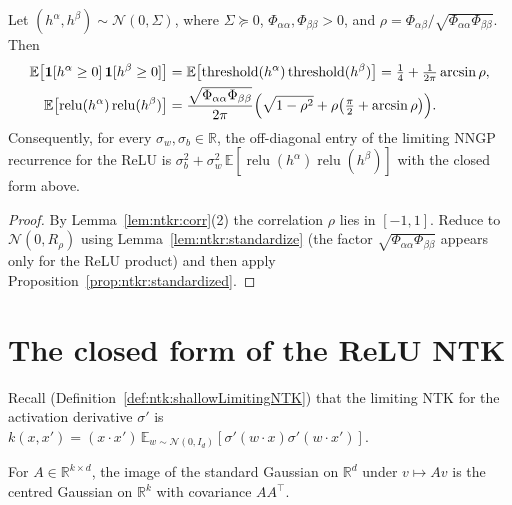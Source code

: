 \begin{theorem}\label{thm:ntkr:choSaul}
  \leanok
Let $(h^\alpha,h^\beta)\sim\mathcal N(0,\Sigma)$, where $\Sigma\succeq0$, $\Phi_{\alpha\alpha},\Phi_{\beta\beta}>0$, and
$\rho=\Phi_{\alpha\beta}/\sqrt{\Phi_{\alpha\alpha}\Phi_{\beta\beta}}$. Then
\begin{align*}
  \mathbb E\bigl[\mathbf 1[h^\alpha\ge0]\,\mathbf 1[h^\beta\ge0]\bigr]
    &=\mathbb E\bigl[\operatorname{threshold}(h^\alpha)\operatorname{threshold}(h^\beta)\bigr]=\tfrac14+\tfrac1{2\pi}\arcsin\rho,\\
  \mathbb E\bigl[\operatorname{relu}(h^\alpha)\operatorname{relu}(h^\beta)\bigr]
    &=\frac{\sqrt{\Phi_{\alpha\alpha}\Phi_{\beta\beta}}}{2\pi}\Bigl(\sqrt{1-\rho^2}+\rho\bigl(\tfrac\pi2+\arcsin\rho\bigr)\Bigr).
\end{align*}
Consequently, for every $\sigma_w,\sigma_b\in\mathbb R$, the off-diagonal entry of the limiting NNGP recurrence for the ReLU is
$\sigma_b^2+\sigma_w^2\,\mathbb E[\operatorname{relu}(h^\alpha)\operatorname{relu}(h^\beta)]$ with the closed form above.
\end{theorem}

\begin{proof}
  \leanok
By Lemma~\ref{lem:ntkr:corr}(2) the correlation $\rho$ lies in $[-1,1]$. Reduce to $\mathcal N(0,R_\rho)$ using
Lemma~\ref{lem:ntkr:standardize} (the factor $\sqrt{\Phi_{\alpha\alpha}\Phi_{\beta\beta}}$ appears only for the ReLU
product) and then apply Proposition~\ref{prop:ntkr:standardized}.
\end{proof}


\section{The closed form of the ReLU NTK}\label{sec:ntkr:closedForm}

Recall (Definition~\ref{def:ntk:shallowLimitingNTK}) that the limiting NTK for the activation derivative $\sigma'$ is
$k(x,x')=(x\cdot x')\,\mathbb E_{w\sim\mathcal N(0,I_d)}[\sigma'(w\cdot x)\sigma'(w\cdot x')]$.

\begin{lemma}\label{lem:ntkr:matrixPush}
  \leanok
For $A\in\mathbb R^{k\times d}$, the image of the standard Gaussian on $\mathbb R^d$ under
$v\mapsto Av$ is the centred Gaussian on $\mathbb R^k$ with covariance $AA^\top$.
\end{lemma}

